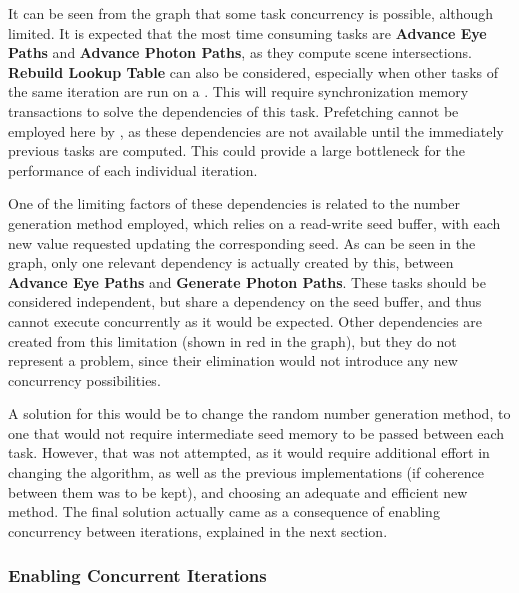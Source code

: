 \documentclass[main.tex]{subfiles}
\begin{document}

It can be seen from the graph that some task concurrency is possible, although limited. It is expected that the most time consuming tasks are \textbf{Advance Eye Paths} and \textbf{Advance Photon Paths}, as they compute scene intersections. \textbf{Rebuild Lookup Table} can also be considered, especially when other tasks of the same iteration are run on a \gpu. This will require synchronization memory transactions to solve the dependencies of this task. Prefetching cannot be employed here by \starpu, as these dependencies are not available until the immediately previous tasks are computed. This could provide a large bottleneck for the performance of each individual iteration.

One of the limiting factors of these dependencies is related to the number generation method employed, which relies on a read-write seed buffer, with each new value requested updating the corresponding seed. As can be seen in the graph, only one relevant dependency is actually created by this, between \textbf{Advance Eye Paths} and \textbf{Generate Photon Paths}. These tasks should be considered independent, but share a dependency on the seed buffer, and thus cannot execute concurrently as it would be expected. Other dependencies are created from this limitation (shown in red in the graph), but they do not represent a problem, since their elimination would not introduce any new concurrency possibilities.

A solution for this would be to change the random number generation method, to one that would not require intermediate seed memory to be passed between each task. However, that was not attempted, as it would require additional effort in changing the algorithm, as well as the previous implementations (if coherence between them was to be kept), and choosing an adequate and efficient new method. The final solution actually came as a consequence of enabling concurrency between iterations, explained in the next section.


\subsubsection{Enabling Concurrent Iterations} \label{section:starpu_concurrent_iters}
\end{document}
